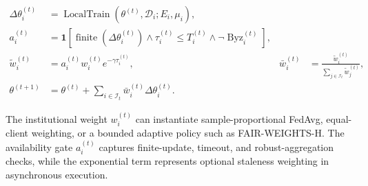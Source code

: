 \begin{equation}
\begin{aligned}
\Delta\theta_i^{(t)}
&= \operatorname{LocalTrain}\!\left(\theta^{(t)},\mathcal{D}_i;E_i,\mu_i\right), \\
a_i^{(t)}
&= \mathbf{1}\!\left[
\operatorname{finite}(\Delta\theta_i^{(t)})
\land \tau_i^{(t)}\le T_i^{(t)}
\land \neg\operatorname{Byz}_i^{(t)}
\right], \\
\widetilde w_i^{(t)}
&= a_i^{(t)}w_i^{(t)}e^{-\gamma\tau_i^{(t)}},
&
\bar w_i^{(t)}
&= \frac{\widetilde w_i^{(t)}}{\sum_{j\in\mathcal{I}_t}\widetilde w_j^{(t)}}, \\
\theta^{(t+1)}
&= \theta^{(t)}
+ \sum_{i\in\mathcal{I}_t}\bar w_i^{(t)}\Delta\theta_i^{(t)}.
\end{aligned}
\label{eq:pathologyfl}
\end{equation}

\noindent The institutional weight $w_i^{(t)}$ can instantiate sample-proportional FedAvg, equal-client weighting, or a bounded adaptive policy such as FAIR-WEIGHTS-H. The availability gate $a_i^{(t)}$ captures finite-update, timeout, and robust-aggregation checks, while the exponential term represents optional staleness weighting in asynchronous execution.

